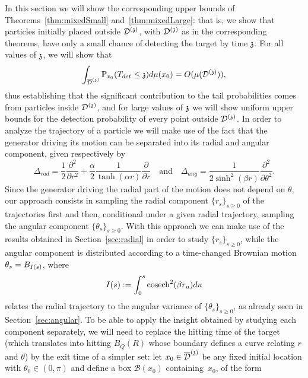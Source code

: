In this section we will show the corresponding upper bounds of Theorems~\ref{thm:mixedSmall} and~\ref{thm:mixedLarge}: that is, we show that particles initially placed outside $\dt$, with $\dt$ as in the corresponding theorems, have only a small chance of detecting the target by time $\ss$. For all values of $\ss$, we will show that
\[\int_{\ndt}\PP_{x_0}(T_{det}\leq \ss)d\mu(x_0)=O(\mu(\dt)),\]
thus establishing that the significant contribution %
to the tail probabilities comes from particles inside $\dt$, and for large values of $\ss$ we will show uniform upper bounds for the detection probability of every point outside $\dt$. %
In order to analyze the trajectory of a particle we will make use of the fact that the generator driving its motion can be separated into its radial and angular component, given respectively by
\[\Delta_{rad} = \frac{1}{2}\frac{\partial^2}{\partial r^2}+\frac{\alpha}{2}\frac{1}{\tanh(\alpha r)}\frac{\partial}{\partial r}\quad\text{and}\quad \Delta_{ang}=\frac{1}{2\sinh^2(\beta r)}\frac{\partial^2}{\partial\theta^2}.\]
Since the generator driving the radial part of the motion does not depend on $\theta$, our approach consists in sampling the radial component $\{r_s\}_{s\geq0}$ of the trajectories first and then, conditional under a given radial trajectory, sampling the angular component $\{\theta_s\}_{s\geq0}$. With this approach we can make use of the results obtained in Section~\ref{sec:radial} in order to study $\{r_s\}_{s\geq 0}$, while the angular component is distributed according to a time-changed Brownian motion $\theta_s=B_{\II{s}}$, where
\[\II{s}:=\int_0^s\cosech^{2}(\beta r_u)du\]
relates the radial trajectory to the angular variance of $\{\theta_s\}_{s\geq 0}$, as already seen in Section~\ref{sec:angular}. To be able to apply the insight obtained by studying each component separately, we will need to replace the hitting time of the target (which translates into hitting $B_Q(R)$ whose boundary defines a curve relating $r$ and $\theta$) by the exit time of a simpler set: let $x_0\in\ndt$ be any fixed initial location with $\theta_0\in(0,\pi)$  and define a box $\mathcal{B}(x_0)$ containing~$x_0$, of the form 
